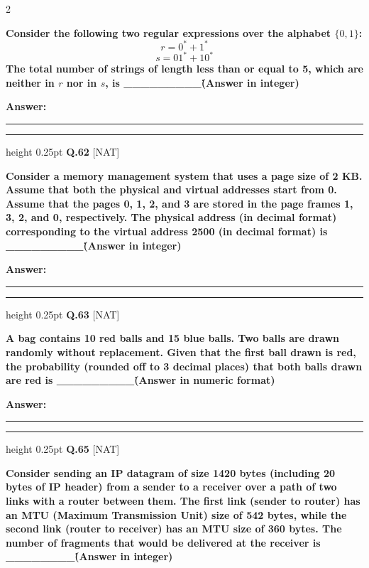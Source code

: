 \documentclass[a4paper,10pt,twoside]{article}
\begin{document}
\begin{multicols}{2}
\par\vspace{2pt}
{\bfseries Consider the following two regular expressions over the alphabet $\{0,1\}$:
\[ r = 0^* + 1^* \]
\[ s = 01^* + 10^* \]
The total number of strings of length less than or equal to 5, which are neither in $r$ nor in $s$, is \_\_\_\_\_\_\_\_\_\. (Answer in integer) \par}
\par\vspace{3pt}\noindent\textbf{Answer:} \rule{3.2cm}{0.4pt}
\par\vspace{6pt}\hrule height 0.25pt\vspace{6pt}
\noindent\textbf{Q.62} \hfill {\footnotesize\textsf{[NAT]}}
\par\vspace{2pt}
{\bfseries Consider a memory management system that uses a page size of 2 KB. Assume that both the physical and virtual addresses start from 0. Assume that the pages 0, 1, 2, and 3 are stored in the page frames 1, 3, 2, and 0, respectively. The physical address (in decimal format) corresponding to the virtual address 2500 (in decimal format) is \_\_\_\_\_\_\_\_\_\. (Answer in integer) \par}
\par\vspace{3pt}\noindent\textbf{Answer:} \rule{3.2cm}{0.4pt}
\par\vspace{6pt}\hrule height 0.25pt\vspace{6pt}
\noindent\textbf{Q.63} \hfill {\footnotesize\textsf{[NAT]}}
\par\vspace{2pt}
{\bfseries A bag contains 10 red balls and 15 blue balls. Two balls are drawn randomly without replacement. Given that the first ball drawn is red, the probability (rounded off to 3 decimal places) that both balls drawn are red is \_\_\_\_\_\_\_\_\_\. (Answer in numeric format) \par}
\par\vspace{3pt}\noindent\textbf{Answer:} \rule{3.2cm}{0.4pt}
\par\vspace{6pt}\hrule height 0.25pt\vspace{6pt}
\noindent\textbf{Q.65} \hfill {\footnotesize\textsf{[NAT]}}
\par\vspace{2pt}
{\bfseries Consider sending an IP datagram of size 1420 bytes (including 20 bytes of IP header) from a sender to a receiver over a path of two links with a router between them. The first link (sender to router) has an MTU (Maximum Transmission Unit) size of 542 bytes, while the second link (router to receiver) has an MTU size of 360 bytes. The number of fragments that would be delivered at the receiver is \_\_\_\_\_\_\_\_\. (Answer in integer) \par}

\end{multicols}
\end{document}
